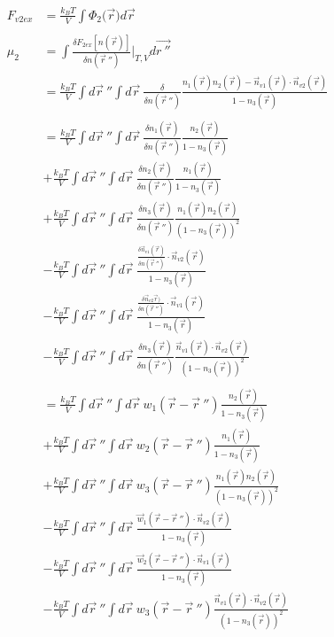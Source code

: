 \documentclass[double,12pt]{beavtex}
\begin{document}
\begin{align}
    F_{v2ex} &= \frac{k_BT}{V}\int \Phi_2(\vec{r}{) d}\vec{r} \\ \nonumber\\
    \mu_2 &= \int \frac{\delta F_{2ex}[n(\vec r)]}{\delta n(\vec r~'')}
          \bigg|_{T,V} d\vec{r~''} \\
%
          &= \frac{k_BT}{V} \int d\vec r~'' \int d \vec r ~
          \frac{\delta }{\delta n(\vec r~'')}
          \frac{n_1(\vec r)n_2(\vec r)-\vec n_{v1}(\vec r)\cdot 
          \vec n_{v2}(\vec r)}{1-n_3(\vec r)}   \nonumber\\  \\        
%
          &= \frac{k_BT}{V} \int d\vec r~'' \int d \vec r ~
          \frac{\delta n_1(\vec r)}{\delta n(\vec r~'')}
          \frac{n_2(\vec r)}{1-n_3(\vec r)}   \nonumber\\
          &+\frac{k_BT}{V} \int d\vec r~'' \int d \vec r ~
          \frac{\delta n_2(\vec r)}{\delta n(\vec r~'')}
          \frac{n_1(\vec r)}{1-n_3(\vec r)}   \nonumber\\
          &+\frac{k_BT}{V} \int d\vec r~'' \int d \vec r~
          \frac{\delta n_3(\vec r)}{\delta n(\vec r~'')}
          \frac{n_1(\vec r)n_2(\vec r)}{(1-n_3(\vec r))^2}  \nonumber\\
          &-\frac{k_BT}{V} \int d\vec r~'' \int d \vec r~\frac{\frac{\delta 
          \vec n_{v1}(\vec r)}{\delta n(\vec r~'')}\cdot \vec n_{v2}(\vec r)}
          {1-n_3(\vec r)}  \nonumber\\
          &-\frac{k_BT}{V} \int d\vec r~'' \int d \vec r~\frac{\frac{\delta 
          \vec n_{v2}\vec r)}{\delta n(\vec r~'')}\cdot \vec n_{v1}(\vec r)}
          {1-n_3(\vec r)}  \nonumber\\
          &-\frac{k_BT}{V} \int d\vec r~''\int d \vec r ~
          \frac{\delta n_3(\vec r)}{\delta n(\vec r~'')}
           \frac{\vec n_{v1}(\vec r)\cdot \vec n_{v2}(\vec r)}
           {(1-n_3(\vec r))^2} \\ \nonumber\\
%
          &= \frac{k_BT}{V} \int d\vec r~'' \int d \vec r ~w_1(\vec r-\vec r~'')
          \frac{n_2(\vec r)}{1-n_3(\vec r)}   \nonumber\\
          &+\frac{k_BT}{V} \int d\vec r~'' \int d \vec r ~w_2(\vec r-\vec r~'')
          \frac{n_1(\vec r)}{1-n_3(\vec r)}   \nonumber\\
          &+\frac{k_BT}{V} \int d\vec r~'' \int d \vec r~w_3(\vec r - \vec r~'') 
          \frac{n_1(\vec r)n_2(\vec r)}{(1-n_3(\vec r))^2}  \nonumber\\
          &-\frac{k_BT}{V} \int d\vec r~'' \int d \vec r~\frac{\vec w_1(\vec r 
          - \vec r~'')\cdot \vec n_{v2}(\vec r)}{1-n_3(\vec r)}  \nonumber\\
          &-\frac{k_BT}{V} \int d\vec r~'' \int d \vec r~\frac{\vec w_2(\vec r 
          - \vec r~'')\cdot \vec n_{v1}(\vec r)}{1-n_3(\vec r)}  \nonumber\\
          &-\frac{k_BT}{V} \int d\vec r~''\int d \vec r ~w_3(\vec r - \vec r~'')
           \frac{\vec n_{v1}(\vec r)\cdot \vec n_{v2}(\vec r)}
           {(1-n_3(\vec r))^2} 
\end{align}
\end{document}
